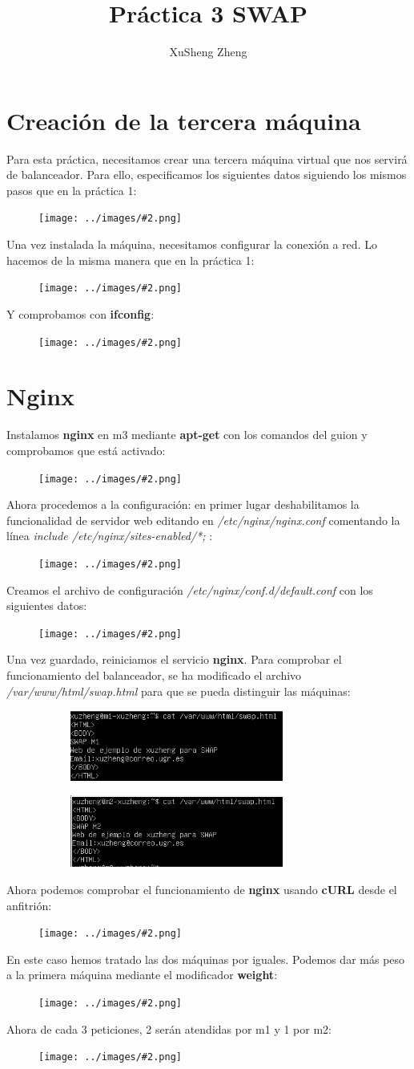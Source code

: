 \documentclass[twoside]{article}
\title{Práctica 3 SWAP}
\author{XuSheng Zheng}
\date{}
\newcommand{\image}[2]{
\begin{figure}[H]
    \texttt{[image: ../images/\#2.png]}
    \centering
\end{figure}
}
\begin{document}
\maketitle
\tableofcontents
\newpage

\section{Creación de la tercera máquina}
Para esta práctica, necesitamos crear una tercera máquina virtual que nos servirá de balanceador. Para ello, especificamos los siguientes datos siguiendo los mismos pasos que en la práctica 1:
\image{8}{1}
Una vez instalada la máquina, necesitamos configurar la conexión a red. Lo hacemos de la misma manera que en la práctica 1:
\image{8}{2}
Y comprobamos con \textbf{ifconfig}:
\image{8}{3}


\section{Nginx}
Instalamos \textbf{nginx} en m3 mediante \textbf{apt-get} con los comandos del guion y comprobamos que está activado:
\image{8}{4}
Ahora procedemos a la configuración: en primer lugar deshabilitamos la funcionalidad de servidor web editando en \textit{/etc/nginx/nginx.conf} comentando la línea \textit{include /etc/nginx/sites-enabled/*;} :
\image{8}{5}
Creamos el archivo de configuración \textit{/etc/nginx/conf.d/default.conf} con los siguientes datos:
\image{8}{6}
Una vez guardado, reiniciamos el servicio \textbf{nginx}. Para comprobar el funcionamiento del balanceador, se ha modificado el archivo \textit{/var/www/html/swap.html} para que se pueda distinguir las máquinas:
\begin{figure}[H]
    \centering
    \begin{subfigure}{.5\textwidth}
        \centering
        \includegraphics[width=7cm]{../images/10.png}
    \end{subfigure}%
    \begin{subfigure}{.5\textwidth}
        \centering
        \includegraphics[width=7cm]{../images/11.png}
    \end{subfigure}
\end{figure}
Ahora podemos comprobar el funcionamiento de \textbf{nginx} usando \textbf{cURL} desde el anfitrión:
\image{8}{7}
En este caso hemos tratado las dos máquinas por iguales. Podemos dar más peso a la primera máquina mediante el modificador \textbf{weight}:
\image{8}{8}
Ahora de cada 3 peticiones, 2 serán atendidas por m1 y 1 por m2:
\image{8}{9}
\end{document}
